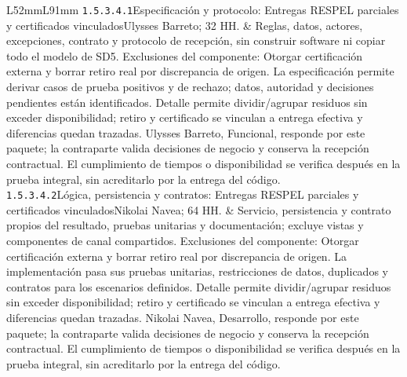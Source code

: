 \begin{longtable}{L{52mm}L{91mm}}
\texttt{1.\allowbreak{}5.\allowbreak{}3.\allowbreak{}4.\allowbreak{}1}\newline Especificación y protocolo: Entregas RESPEL parciales y certificados vinculados\newline Ulysses Barreto; 32 HH. & Reglas, datos, actores, excepciones, contrato y protocolo de recepción, sin construir software ni copiar todo el modelo de SD5. Exclusiones del componente: Otorgar certificación externa y borrar retiro real por discrepancia de origen. La especificación permite derivar casos de prueba positivos y de rechazo; datos, autoridad y decisiones pendientes están identificados. Detalle permite dividir/agrupar residuos sin exceder disponibilidad; retiro y certificado se vinculan a entrega efectiva y diferencias quedan trazadas. Ulysses Barreto, Funcional, responde por este paquete; la contraparte valida decisiones de negocio y conserva la recepción contractual. El cumplimiento de tiempos o disponibilidad se verifica después en la prueba integral, sin acreditarlo por la entrega del código.\\\hline
\texttt{1.\allowbreak{}5.\allowbreak{}3.\allowbreak{}4.\allowbreak{}2}\newline Lógica, persistencia y contratos: Entregas RESPEL parciales y certificados vinculados\newline Nikolai Navea; 64 HH. & Servicio, persistencia y contrato propios del resultado, pruebas unitarias y documentación; excluye vistas y componentes de canal compartidos. Exclusiones del componente: Otorgar certificación externa y borrar retiro real por discrepancia de origen. La implementación pasa sus pruebas unitarias, restricciones de datos, duplicados y contratos para los escenarios definidos. Detalle permite dividir/agrupar residuos sin exceder disponibilidad; retiro y certificado se vinculan a entrega efectiva y diferencias quedan trazadas. Nikolai Navea, Desarrollo, responde por este paquete; la contraparte valida decisiones de negocio y conserva la recepción contractual. El cumplimiento de tiempos o disponibilidad se verifica después en la prueba integral, sin acreditarlo por la entrega del código.\\\hline

\end{longtable}
